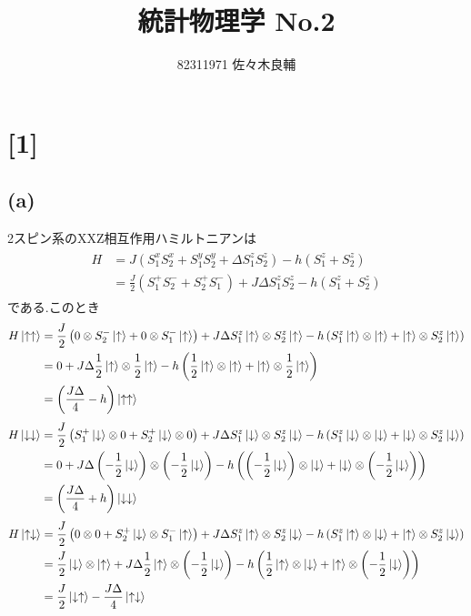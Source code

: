 \documentclass[uplatex,a4j,11pt,dvipdfmx]{jsarticle}
\newcommand{\up}{\uparrow}
\newcommand{\dn}{\downarrow}
\begin{document}
\title{統計物理学 No.2}
\author{82311971 佐々木良輔}
\date{}
\maketitle
\section*{[1]}
\subsection*{(a)}
2スピン系のXXZ相互作用ハミルトニアンは
\begin{align}
  \begin{split}
    H&=J(S_1^xS_2^x+S_1^yS_2^y+\Delta S_1^zS_2^z)-h(S_1^z+S_2^z)\\
    &=\frac{J}{2}(S_1^+S_2^-+S_2^+S_1^-)+J\Delta S_1^zS_2^z-h(S_1^z+S_2^z)
  \end{split}
\end{align}
である.このとき
\begin{align}
  \begin{split}
    H\Ket{\up\up}&=\frac{J}{2}\left(0\otimes S_2^-\Ket{\up}+0\otimes S_1^-\Ket{\up}\right)+J\Delta S_1^z\Ket{\up}\otimes S_2^z\Ket{\up}-h\left(S_1^z\Ket{\up}\otimes\Ket{\up}+\Ket{\up}\otimes S_2^z\Ket{\up}\right)\\
    &=0+J\Delta\frac{1}{2}\Ket{\up}\otimes\frac{1}{2}\Ket{\up}-h\left(\frac{1}{2}\Ket{\up}\otimes\Ket{\up}+\Ket{\up}\otimes\frac{1}{2}\Ket{\up}\right)\\
    &=\left(\frac{J\Delta}{4}-h\right)\Ket{\up\up}
  \end{split}
\end{align}
\begin{align}
  \begin{split}
    H\Ket{\dn\dn}&=\frac{J}{2}\left(S_1^+\Ket{\dn}\otimes0+S_2^+\Ket{\dn}\otimes0\right)+J\Delta S_1^z\Ket{\dn}\otimes S_2^z\Ket{\dn}-h\left(S_1^z\Ket{\dn}\otimes\Ket{\dn}+\Ket{\dn}\otimes S_2^z\Ket{\dn}\right)\\
    &=0+J\Delta\left(-\frac{1}{2}\Ket{\dn}\right)\otimes\left(-\frac{1}{2}\Ket{\dn}\right)
    -h\left(\left(-\frac{1}{2}\Ket{\dn}\right)\otimes\Ket{\dn}+\Ket{\dn}\otimes\left(-\frac{1}{2}\Ket{\dn}\right)\right)\\
    &=\left(\frac{J\Delta}{4}+h\right)\Ket{\dn\dn}
  \end{split}
\end{align}
\begin{align}
  \begin{split}
    H\Ket{\up\dn}&=\frac{J}{2}\left(0\otimes0+S_2^+\Ket{\dn}\otimes S_1^-\Ket{\up}\right)+J\Delta S_1^z\Ket{\up}\otimes S_2^z\Ket{\dn}-h\left(S_1^z\Ket{\up}\otimes\Ket{\dn}+\Ket{\up}\otimes S_2^z\Ket{\dn}\right)\\
    &=\frac{J}{2}\Ket{\dn}\otimes\Ket{\up}+J\Delta\frac{1}{2}\Ket{\up}\otimes\left(-\frac{1}{2}\Ket{\dn}\right)-h\left(\frac{1}{2}\Ket{\up}\otimes\Ket{\dn}+\Ket{\up}\otimes\left(-\frac{1}{2}\Ket{\dn}\right)\right)\\
    &=\frac{J}{2}\Ket{\dn\up}-\frac{J\Delta}{4}\Ket{\up\dn}
  \end{split}
\end{align}
\end{document}
